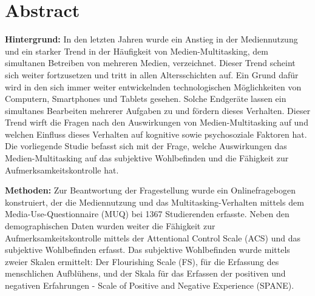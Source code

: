 %
%
\thispagestyle{empty} 
\let\raggedsection\centering
\chapter*{Abstract}\label{label.abstract}
\let\raggedsection\raggedright 
\textbf{Hintergrund:} In den letzten Jahren wurde ein Anstieg in der Mediennutzung und ein starker Trend in der Häufigkeit von Medien-Multitasking, dem simultanen Betreiben von mehreren Medien, verzeichnet. Dieser Trend scheint sich weiter fortzusetzen und tritt in allen Altersschichten auf. Ein Grund dafür wird in den sich immer weiter entwickelnden technologischen Möglichkeiten von Computern, Smartphones und Tablets gesehen. Solche Endgeräte lassen ein simultanes Bearbeiten mehrerer Aufgaben zu und fördern dieses Verhalten. Dieser Trend wirft die Fragen nach den Auswirkungen von Medien-Multitasking auf und welchen Einfluss dieses Verhalten auf kognitive sowie psychosoziale Faktoren hat. Die vorliegende Studie befasst sich mit der Frage, welche Auswirkungen das Medien-Multitasking auf das subjektive Wohlbefinden und die Fähigkeit zur Aufmerksamkeitskontrolle hat.
\par 
\textbf{Methoden:} Zur Beantwortung der Fragestellung wurde ein Onlinefragebogen konstruiert, der die Mediennutzung und das Multitasking-Verhalten mittels dem Media-Use-Questionnaire (MUQ) bei 1367 Studierenden erfasste. Neben den demographischen Daten wurden weiter die Fähigkeit zur Aufmerksamkeitskontrolle mittels der Attentional Control Scale (ACS) und das subjektive Wohlbefinden erfasst. Das subjektive Wohlbefinden wurde mittels zweier Skalen ermittelt: Der Flourishing Scale (FS), für die Erfassung des menschlichen Aufblühens, und der Skala für das Erfassen der positiven und negativen Erfahrungen - Scale of Positive and Negative Experience (SPANE).
\par 
